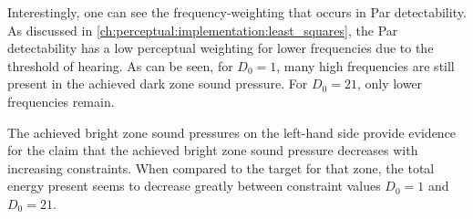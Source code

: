 Interestingly, one can see the frequency-weighting that occurs in Par detectability.
As discussed in \autoref{ch:perceptual:implementation:least_squares}, the Par detectability has a low perceptual weighting for lower frequencies due to the threshold of hearing.
As can be seen, for $D_0 = 1$, many high frequencies are still present in the achieved dark zone sound pressure.
For $D_0=21$, only lower frequencies remain. 

The achieved bright zone sound pressures on the left-hand side provide evidence for the claim that the 
achieved bright zone sound pressure decreases with increasing constraints.
When compared to the target for that zone, the total energy present seems to decrease greatly between 
constraint values $D_0=1$ and $D_0=21$.  
